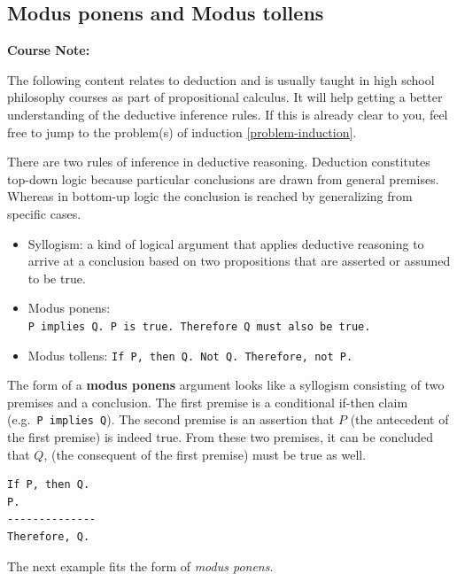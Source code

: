 \documentclass[
  12pt,
]{book}
\providecommand{\tightlist}{%
  \setlength{\itemsep}{0pt}\setlength{\parskip}{0pt}}
\begin{document}
\subsection{Modus ponens and Modus tollens}\label{modus}

\begin{notebox}

\begin{center}
\textbf{Course Note:}

\end{center}

The following content relates to deduction and is usually taught in high school philosophy courses as part of propositional calculus. It will help getting a better understanding of the deductive inference rules. If this is already clear to you, feel free to jump to the problem(s) of induction \ref{problem-induction}.

\end{notebox}

There are two rules of inference in deductive reasoning. Deduction constitutes top-down logic because particular conclusions are drawn from general premises. Whereas in bottom-up logic the conclusion is reached by generalizing from specific cases.

\begin{itemize}
\tightlist
\item
  Syllogism: a kind of logical argument that applies deductive reasoning to arrive at a conclusion based on two propositions that are asserted or assumed to be true.
\item
  Modus ponens: \texttt{P\ implies\ Q.\ P\ is\ true.\ Therefore\ Q\ must\ also\ be\ true.}
\item
  Modus tollens: \texttt{If\ P,\ then\ Q.\ Not\ Q.\ Therefore,\ not\ P.}
\end{itemize}

The form of a \textbf{modus ponens} argument looks like a syllogism consisting of two premises and a conclusion. The first premise is a conditional if-then claim (e.g.~\texttt{P\ implies\ Q}). The second premise is an assertion that \(P\) (the antecedent of the first premise) is indeed true. From these two premises, it can be concluded that \(Q\), (the consequent of the first premise) must be true as well.

\begin{verbatim}
If P, then Q.
P.
--------------
Therefore, Q.
\end{verbatim}

The next example fits the form of \emph{modus ponens}.
\end{document}
